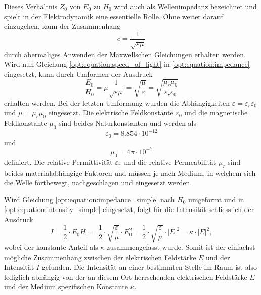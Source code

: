 Dieses Verhältnis $Z_0$ von $E_0$ zu $H_0$ wird auch als Wellenimpedanz bezeichnet und spielt in der Elektrodynamik eine essentielle Rolle.
Ohne weiter darauf einzugehen, kann der Zusammenhang
\begin{equation}
c
=
\frac{1}{\sqrt{\varepsilon\mu}}
\label{opt:equation:speed_of_light}
\end{equation}
durch abermaliges Anwenden der Maxwellschen Gleichungen erhalten werden.
Wird nun Gleichung \eqref{opt:equation:speed_of_light} in \eqref{opt:equation:impedance} eingesetzt, kann durch Umformen der Ausdruck
\begin{equation}
\frac{E_0}{H_0}
=
\mu \frac{1}{\sqrt{\varepsilon\mu}}
=
\sqrt{\frac{\mu}{\varepsilon}}
=
\sqrt{\frac{\mu_r\mu_0}{\varepsilon_r\varepsilon_0}}
\label{opt:equation:impedance_simple}
\end{equation}
erhalten werden.
Bei der letzten Umformung wurden die Abhängigkeiten $\varepsilon = \varepsilon_r \varepsilon_0$ und $\mu = \mu_r \mu_0$ eingesetzt.
Die elektrische Feldkonstante $\varepsilon_0$ und die magnetische Feldkonstante $\mu_0$ sind beides Naturkonstanten und werden als
\begin{equation*}
\varepsilon_0
=
8.854 \cdot 10^{-12}
\end{equation*}
und
\begin{equation*}
\mu_0
=
4\pi \cdot 10^{-7}
\end{equation*}
definiert.
Die relative Permittivität $\varepsilon_r$ und die relative Permeabilität $\mu_r$ sind beides materialabhängige Faktoren und müssen je nach Medium, in welchem sich die Welle fortbewegt, nachgeschlagen und eingesetzt werden.

Wird Gleichung \eqref{opt:equation:impedance_simple} nach $H_0$ umgeformt und in \eqref{opt:equation:intensity_simple} eingesetzt, folgt für die Intensität schliesslich der Ausdruck
\begin{equation}
I
=
\frac{1}{2} \cdot E_0 H_0
=
\frac{1}{2} \cdot \sqrt{\frac{\varepsilon}{\mu}} \cdot E_0^2
=
\frac{1}{2} \cdot \sqrt{\frac{\varepsilon}{\mu}} \cdot |E|^2
=
\kappa \cdot |E|^2
,
\label{opt:equation:intensity}
\end{equation}
wobei der konstante Anteil als $\kappa$ zusammengefasst wurde.
Somit ist der einfachst mögliche Zusammenhang zwischen der elektrischen Feldstärke $E$ und der Intensität $I$ gefunden.
Die Intensität an einer bestimmten Stelle im Raum ist also lediglich abhängig von der an diesem Ort herrschenden elektrischen Feldstärke $E$ und der Medium spezifischen Konstante $\kappa$.

